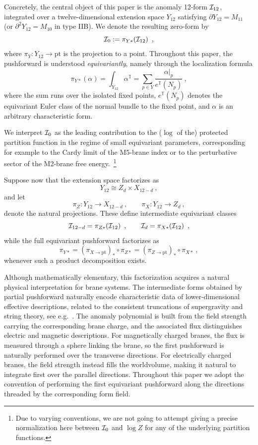 \documentclass[11pt,a4paper]{article}
\def\cI{{\cal I}}
\theoremstyle{definition}
\theoremstyle{identity}
\theoremstyle{remark}
\newcommand{\be}{\begin{equation}}
\newcommand{\ee}{\end{equation}}
\newcommand{\BT}{\mathbb{T}}
\begin{document}
Concretely, the central object of this paper is the anomaly 12-form
$\cI_{12}$, integrated over a twelve-dimensional extension space $Y_{12}$ satisfying
$\partial Y_{12}=M_{11}$ (or $\partial^2Y_{12}=M_{10}$ in type IIB). We denote the resulting zero-form by
\be
\label{eq:I0intro}
\cI_0 :=
\pi_{Y*}\!\left(\cI_{12}\right)\ ,
\ee
where $\pi_Y:Y_{12}\rightarrow\mathrm{pt}$ is the projection to a point. Throughout this paper,
the pushforward is understood \emph{equivariantly}, namely through the localization formula
\be
\pi_{Y*}(\alpha)
=
\int_{Y_{12}}\alpha^{\BT} =
\sum_{p\in Y}
\frac{\alpha|_p}
{e^{\BT}(N_p)}\ , 
\ee
where the sum runs over the isolated fixed points,
$e^{\BT}(N_p)$
denotes the equivariant Euler class of the normal bundle to the fixed point, and $\alpha$ is an arbitrary characteristic form.

We interpret $\cI_0$ as the leading contribution to the ($\log$ of the) protected partition function in the
regime of small equivariant parameters, corresponding for example to the Cardy limit of the
M5-brane index or to the perturbative sector of the M2-brane free energy.~\footnote{Due to varying conventions, we are not going to attempt giving a precise normalization here between $\cI_0$ and $\log Z$ for any of the underlying partition functions.}

Suppose now that the extension space factorizes as
\be
Y_{12}\cong Z_d\times X_{12-d}\ ,
\ee
and let
\be
\pi_Z:Y_{12}\rightarrow X_{12-d}\ ,
\qquad
\pi_X:Y_{12}\rightarrow Z_d\ ,
\ee
denote the natural projections. These define intermediate equivariant classes
\be
\cI_{12-d}
=
\pi_{Z*}\!\left(\cI_{12}\right)\ ,
\qquad
\cI_d
=
\pi_{X*}\!\left(\cI_{12}\right)\ ,
\ee
while the full equivariant pushforward factorizes as
\be
\label{eq:pushforwardfactorization}
\pi_{Y*}
=
(\pi_{X\rightarrow\mathrm{pt}})_*\circ\pi_{Z*}
=
(\pi_{Z\rightarrow\mathrm{pt}})_*\circ\pi_{X*}\ ,
\ee
whenever such a product decomposition exists.

Although mathematically elementary, this factorization acquires a natural physical
interpretation for brane systems. The intermediate forms obtained by partial pushforward naturally encode characteristic data of lower-dimensional effective descriptions, related to the consistent truncations of supergravity and string theory, see e.g.\ \cite{Cvetic:2000dm,Lee:2014mla,Cassani:2019vcl}. The anomaly polynomial is built from the field strength
carrying the corresponding brane charge, and the associated flux distinguishes electric and
magnetic descriptions. For magnetically charged branes, the flux is measured through a sphere
linking the brane, so the first pushforward is naturally performed over the transverse
directions. For electrically charged branes, the field strength instead fills the worldvolume,
making it natural to integrate first over the parallel directions. Throughout this paper we
adopt the convention of performing the first equivariant pushforward along the directions
threaded by the corresponding form field.
\end{document}
